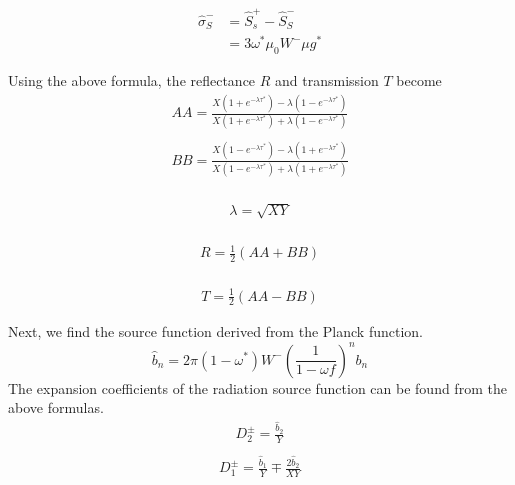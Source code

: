 \begin{equation}
\begin{aligned}
\hat{\sigma}_{S}^{-} &=\hat{S}_{s}^{+}-\hat{S}_{S}^{-} \\
&=3 \omega^{*} \mu_{0} W^{-} \mu g^{*}
\end{aligned}
\end{equation}

Using the above formula, the reflectance \(R\) and transmission \(T\)
become \begin{equation}
\begin{array}{c}
A A=\frac{X\left(1+e^{-\lambda \tau^{*}}\right)-\lambda\left(1-e^{-\lambda \tau^{*}}\right)}{X\left(1+e^{-\lambda \tau^{*}}\right)+\lambda\left(1-e^{-\lambda \tau^{*}}\right)} \\
\end{array}
\end{equation} \begin{equation}
\begin{array}{c}
B B=\frac{X\left(1-e^{-\lambda \tau^{*}}\right)-\lambda\left(1+e^{-\lambda \tau^{*}}\right)}{X\left(1-e^{-\lambda \tau^{*}}\right)+\lambda\left(1+e^{-\lambda \tau^{*}}\right)} \\
\end{array}
\end{equation}

\begin{equation}
\begin{array}{c}
\lambda=\sqrt{X Y} \\
\end{array}
\end{equation}

\begin{equation}
\begin{array}{c}
R=\frac{1}{2}(A A+B B) \\
\end{array}
\end{equation}

\begin{equation}
\begin{array}{c}
T=\frac{1}{2}(A A-B B)
\end{array}
\end{equation}

Next, we find the source function derived from the Planck function. \begin{equation}
\hat{b}_{n}=2 \pi\left(1-\omega^{*}\right) W^{-}\left(\frac{1}{1-\omega f}\right)^{n} b_{n}
\end{equation} The expansion coefficients of the radiation source function can be
found from the above formulas. \begin{equation}
\begin{array}{l}
D_{2}^{\pm}=\frac{\hat{b}_{2}}{Y} \\
\end{array}
\end{equation} \begin{equation}
\begin{array}{l}
D_{1}^{\pm}=\frac{\hat{b}_{1}}{Y} \mp \frac{2 \hat{b}_{2}}{X Y} \\
\end{array}
\end{equation}

